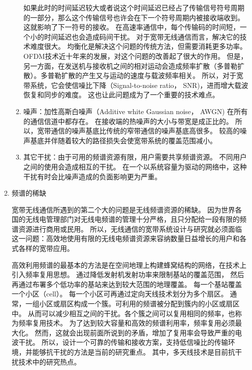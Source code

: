 \begin{enumerate}[1)]
\begin{enumerate}[(1)]
如果此时的时间延迟较大或者说这个时间延迟已经占了传输信号符号周期的一部分，那么这个传输信号也许会在下一个符号周期内被接收端收到。
这就影响了下一符号的接收。
在高速率通信中，每个传输码的时间短，一个小的时间延迟也会造成码间干扰。
对于宽带无线通信而言，解决它的技术难度很大。
均衡化是解决这个问题的传统方法，但需要消耗更多功率。
OFDM技术近十年来的发展，对这个问题的改善起了很大的作用。
但是，另一方面，在发送机与接收机之间的相对运动会造成频率扩散（多普勒扩散）。多普勒扩散的产生又与运动的速度与载波频率相关。
所以，对于宽带系统，它会使信噪比下降（Signal-to-noise ratio， SNR)，进而增大载波恢复和同步的难度。
这也让此问题成为了一个重要的技术难点。
\item 噪声：加性高斯白噪声（Additive white Gaussian noise， AWGN) 在所有的通信信道中都存在。
在接收端的热噪声的大小与带宽是成正比的。
所以，宽带通信的噪声基底比传统的窄带通信的噪声基底高很多。
较高的噪声基底并伴随着较大的路径损失会使宽带系统的覆盖范围减小。
\item 其它干扰：由于可用的频谱资源有限，用户需要共享频谱资源。
不同用户之间的使用会造成相互的干扰。
在一个以系统容量为驱动的网络中，这种干扰有时会比噪声造成的负面影响更为严重。
\end{enumerate}
\item{频谱的稀缺}

宽带无线通信所遇到的第二个大的问题是无线频谱资源的稀缺。
因为世界各国的无线电管理部门对无线电频谱的管理十分严格，且只分配给一段有限的频谱资源进行商用或民用。
所以，无线通信的宽带系统设计与研究就必须面临这一问题：高效地使用有限的无线电频谱资源来容纳数量日益增长的用户和各式各样的宽带应用。
\par 高效利用频谱的最基本的方法是在空间地理上构建蜂窝结构的网络，在技术上引入频率复用思想。
通过降低发射机发射功率来限制基站的覆盖范围，
然后再通过布署多个低功率的基站来达到较大范围的地理覆盖。
每一个基站覆盖一个小区（cell）。
每一个小区可再通过定向天线技术划分为多个扇区。
通常，一组小区或扇区构成一个簇。可利用的频谱被分配到簇内的小区或扇区中。
从而可以减少相互之间的干扰。各个簇之间可以复用相同的频率，也称为频率复用技术。
为了达到较大容量和高效的频谱利用率，频率复用必须最大化。
然而，这就会出现前面所说到的矛盾，增加了复用率会导致严重的电波干扰。
所以，设计一个可靠的传输和接收方案，支持低信噪比的传输环境，并能够抗干扰的方法是当前的研究重点。
其中，多天线技术是目前抗干扰技术中的研究热点。


\end{enumerate}
